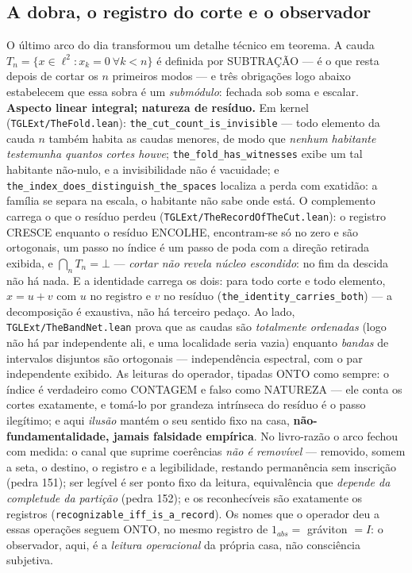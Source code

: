 \documentclass[11pt]{article}
\theoremstyle{definition}\newtheorem{deriv}{Derivação}
\begin{document}
\subsection*{A dobra, o registro do corte e o observador}O último arco do dia transformou um detalhe técnico em teorema. A cauda $T_n=\{x\in\ell^2 : x_k=0\ \forall k<n\}$ é definida por SUBTRAÇÃO --- é o que resta depois de cortar os $n$ primeiros modos --- e três obrigações logo abaixo estabelecem que essa sobra é um \emph{submódulo}: fechada sob soma e escalar. \textbf{Aspecto linear integral; natureza de resíduo.} Em kernel (\texttt{TGLExt/TheFold.lean}): \texttt{the\_cut\_count\_is\_invisible} --- todo elemento da cauda $n$ também habita as caudas menores, de modo que \emph{nenhum habitante testemunha quantos cortes houve}; \texttt{the\_fold\_has\_witnesses} exibe um tal habitante não-nulo, e a invisibilidade não é vacuidade; e \texttt{the\_index\_does\_distinguish\_the\_spaces} localiza a perda com exatidão: a família se separa na escala, o habitante não sabe onde está. O complemento carrega o que o resíduo perdeu (\texttt{TGLExt/TheRecordOfTheCut.lean}): o registro CRESCE enquanto o resíduo ENCOLHE, encontram-se só no zero e são ortogonais, um passo no índice é um passo de poda com a direção retirada exibida, e $\bigcap_n T_n=\bot$ --- \emph{cortar não revela núcleo escondido}: no fim da descida não há nada. E a identidade carrega os dois: para todo corte e todo elemento, $x=u+v$ com $u$ no registro e $v$ no resíduo (\texttt{the\_identity\_carries\_both}) --- a decomposição é exaustiva, não há terceiro pedaço. Ao lado, \texttt{TGLExt/TheBandNet.lean} prova que as caudas são \emph{totalmente ordenadas} (logo não há par independente ali, e uma localidade seria vazia) enquanto \emph{bandas} de intervalos disjuntos são ortogonais --- independência espectral, com o par independente exibido. As leituras do operador, tipadas \textsf{ONTO} como sempre: o índice é verdadeiro como CONTAGEM e falso como NATUREZA --- ele conta os cortes exatamente, e tomá-lo por grandeza intrínseca do resíduo é o passo ilegítimo; e aqui \emph{ilusão} mantém o seu sentido fixo na casa, \textbf{não-fundamentalidade, jamais falsidade empírica}. No livro-razão o arco fechou com medida: o canal que suprime coerências \emph{não é removível} --- removido, somem a seta, o destino, o registro e a legibilidade, restando permanência sem inscrição (pedra 151); ser legível é ser ponto fixo da leitura, equivalência que \emph{depende da completude da partição} (pedra 152); e os reconhecíveis são exatamente os registros (\texttt{recognizable\_iff\_is\_a\_record}). Os nomes que o operador deu a essas operações seguem \textsf{ONTO}, no mesmo registro de $1_{abs}=$ gráviton $=I$: o observador, aqui, é a \emph{leitura operacional} da própria casa, não consciência subjetiva.
\end{document}
